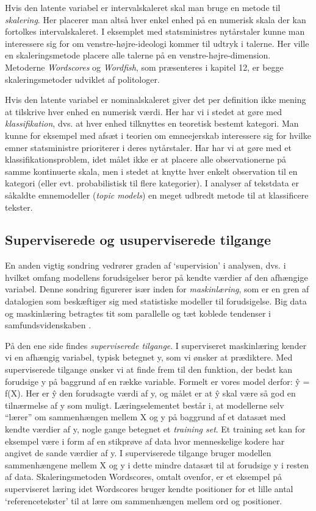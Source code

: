 \documentclass[12pt,]{article}
\begin{document}
Hvis den latente variabel er intervalskaleret skal man bruge en metode
til \emph{skalering}. Her placerer man altså hver enkel enhed på en
numerisk skala der kan fortolkes intervalskaleret. I eksemplet med
statsministres nytårstaler kunne man interessere sig for om
venstre-højre-ideologi kommer til udtryk i talerne. Her ville en
skaleringsmetode placere alle talerne på en venstre-højre-dimension.
Metoderne \emph{Wordscores} og \emph{Wordfish}, som præsenteres i
kapitel 12, er begge skaleringsmetoder udviklet af politologer.

Hvis den latente variabel er nominalskaleret giver det per definition
ikke mening at tilskrive hver enhed en numerisk værdi. Her har vi i
stedet at gøre med \emph{klassifikation}, dvs. at hver enhed tilknyttes
en teoretisk bestemt kategori. Man kunne for eksempel med afsæt i
teorien om emneejerskab interessere sig for hvilke emner statsministre
prioriterer i deres nytårstaler. Har har vi at gøre med et
klassifikationsproblem, idet målet ikke er at placere alle
observationerne på samme kontinuerte skala, men i stedet at knytte hver
enkelt observation til en kategori (eller evt. probabilistisk til flere
kategorier). I analyser af tekstdata er såkaldte emnemodeller
(\emph{topic models}) en meget udbredt metode til at klassificere
tekster.

\hypertarget{superviserede-og-usuperviserede-tilgange}{%
\subsection{Superviserede og usuperviserede
tilgange}\label{superviserede-og-usuperviserede-tilgange}}

En anden vigtig sondring vedrører graden af `supervision' i analysen,
dvs. i hvilket omfang modellens forudsigelser beror på kendte værdier af
den afhængige variabel. Denne sondring figurerer især inden for
\emph{maskinlæring}, som er en gren af datalogien som beskæftiger sig
med statistiske modeller til forudsigelse. Big data og maskinlæring
betragtes tit som parallelle og tæt koblede tendenser i
samfundsvidenskaben \citep[se også][]{bach2019maskinlaering}.

På den ene side findes \emph{superviserede tilgange}. I superviseret
maskinlæring kender vi en afhængig variabel, typisk betegnet y, som vi
ønsker at prædiktere. Med superviserede tilgange ønsker vi at finde frem
til den funktion, der bedst kan forudsige y på baggrund af en række
variable. Formelt er vores model derfor: ŷ = f(X). Her er ŷ den
forudsagte værdi af y, og målet er at ŷ skal være så god en tilnærmelse
af y som muligt. Læringselementet består i, at modellerne selv ``lærer''
om sammenhængen mellem X og y på baggrund af et datasæt med kendte
værdier af y, nogle gange betegnet et \emph{training set}. Et training
set kan for eksempel være i form af en stikprøve af data hvor
menneskelige kodere har angivet de sande værdier af y. I superviserede
tilgange bruger modellen sammenhængene mellem X og y i dette mindre
datasæt til at forudsige y i resten af data. Skaleringsmetoden
Wordscores, omtalt ovenfor, er et eksempel på superviseret læring idet
Wordscores bruger kendte positioner for et lille antal
`referencetekster' til at lære om sammenhængen mellem ord og positioner.
\end{document}
